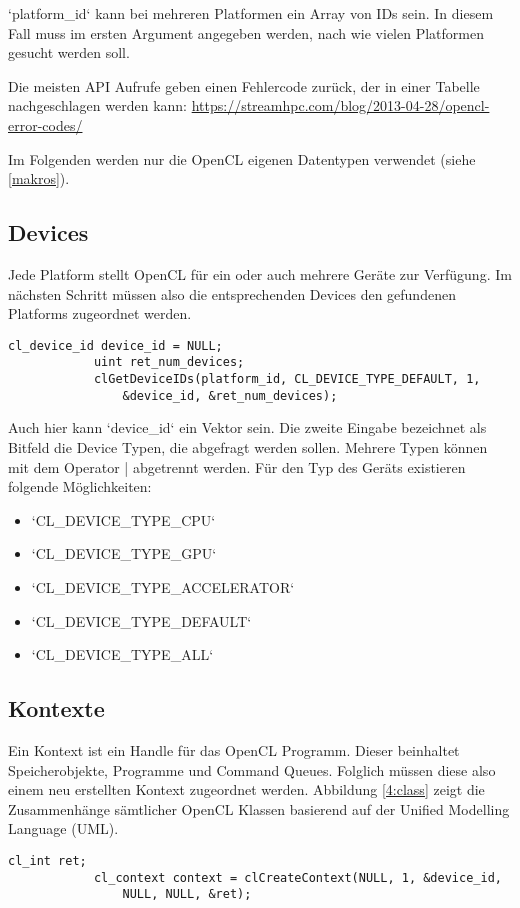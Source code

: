 			\li`platform_id` kann bei mehreren Platformen ein Array von IDs sein. In diesem Fall muss im ersten Argument angegeben werden, nach wie vielen Platformen gesucht werden soll.
			
			Die meisten \Gls{API} Aufrufe geben einen Fehlercode zurück, der in einer Tabelle nachgeschlagen werden kann: \url{https://streamhpc.com/blog/2013-04-28/opencl-error-codes/}
			
			Im Folgenden werden nur die OpenCL eigenen Datentypen verwendet (siehe \ref{makros}).
							
			\subsection{Devices}
			Jede \Gls{Platform} stellt OpenCL für ein oder auch mehrere Geräte zur Verfügung. Im nächsten Schritt müssen also die entsprechenden Devices den gefundenen \Glspl{Platform} zugeordnet werden.		
			\begin{lstlisting}[caption=Deviceabfrage]
			cl_device_id device_id = NULL;	
			uint ret_num_devices;
			clGetDeviceIDs(platform_id, CL_DEVICE_TYPE_DEFAULT, 1, 
				&device_id, &ret_num_devices);
			\end{lstlisting}
			
			Auch hier kann \li`device_id` ein Vektor sein. Die zweite Eingabe bezeichnet als Bitfeld die Device Typen, die abgefragt werden sollen. Mehrere Typen können mit dem Operator | abgetrennt werden. Für den Typ des Geräts existieren folgende Möglichkeiten:
						
			\begin{itemize}		
			\item \li`CL_DEVICE_TYPE_CPU`	
			\item \li`CL_DEVICE_TYPE_GPU`		
			\item \li`CL_DEVICE_TYPE_ACCELERATOR`		
			\item \li`CL_DEVICE_TYPE_DEFAULT`			
			\item \li`CL_DEVICE_TYPE_ALL`
			\end{itemize}
				
			\subsection{Kontexte}
			Ein \Gls{Kontext} ist ein \Gls{Handle} für das OpenCL Programm. Dieser beinhaltet Speicherobjekte, Programme und Command Queues. Folglich müssen diese also einem neu erstellten \Gls{Kontext} zugeordnet werden. Abbildung \ref{4:class} zeigt die Zusammenhänge sämtlicher OpenCL Klassen \autocite{oclRC} basierend auf der Unified Modelling Language (UML). \autocite{uml}
			\begin{lstlisting}[caption=Kontexte]
			cl_int ret;
			cl_context context = clCreateContext(NULL, 1, &device_id, 
				NULL, NULL, &ret);	
			\end{lstlisting}
			

